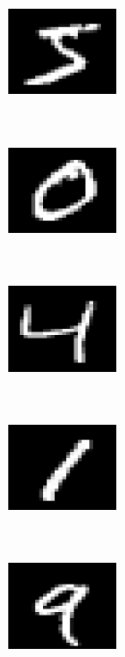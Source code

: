 \documentclass[a4paper,11pt]{report}
\begin{document}
		\begin{figure}[h]
			\centering
			\begin{subfigure}[t]{0.17\textwidth}
				\centering
				\includegraphics[height=0.9in]{mnist_1.eps}
			\end{subfigure}%
			~ 
			\begin{subfigure}[t]{0.17\textwidth}
        \centering
        \includegraphics[height=0.9in]{mnist_2.eps}
			\end{subfigure}
			~ 
			\begin{subfigure}[t]{0.17\textwidth}
        \centering
        \includegraphics[height=0.9in]{mnist_3.eps}
			\end{subfigure}
			~ 
			\begin{subfigure}[t]{0.17\textwidth}
        \centering
        \includegraphics[height=0.9in]{mnist_4.eps}
			\end{subfigure}
			~ 
			\begin{subfigure}[t]{0.17\textwidth}
        \centering
        \includegraphics[height=0.9in]{mnist_5.eps}
			\end{subfigure}
			\\
			~
			\begin{subfigure}[t]{0.17\textwidth}

\end{subfigure}
\end{figure}
\end{document}
